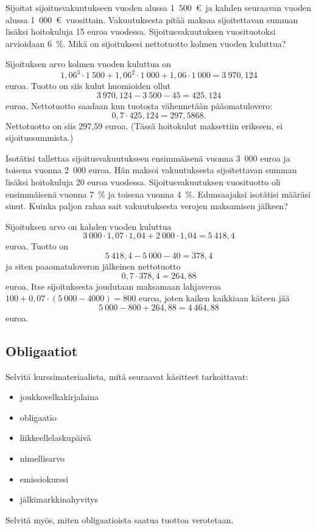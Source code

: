 \documentclass{article}\usepackage[]{graphicx}\usepackage[]{color}
\begin{document}
\begin{question} Sijoitat sijoitusvakuutukseen vuoden alussa 1~500~\euro\ ja kahden seuraavan vuoden alussa 1~000~\euro\ vuosittain. Vakuutuksesta pitää maksaa sijoitettavan summan lisäksi hoitokuluja 15 euroa vuodessa. Sijoitusvakuutuksen vuosituotoksi arvioidaan 6~\%. Mikä on sijoituksesi nettotuotto kolmen vuoden kuluttua? 
\end{question}
\begin{solution}


Sijoituksen arvo kolmen vuoden kuluttua on 
\[
  1{,}06^3\cdot1~500 + 1{,}06^2\cdot1~000 + 1{,}06\cdot1~000 = 3~970{,}124
\]
euroa.
Tuotto on siis kulut huomioiden ollut 
\[
  3~970{,}124 - 3~500 - 45 = 425{,}124
  \]
  euroa. Nettotuotto saadaan kun tuotosta vähennetään pääomatulovero:
\[
  0,7\cdot425{,}124 = 297{,}5868.
\]
Nettotuotto on siis 297{,}59 euroa. (Tässä hoitokulut maksettiin erikseen, ei sijoitussummista.)
\end{solution}

\begin{question} Isotätisi tallettaa sijoitusvakuutukseen ensimmäisenä vuonna 3~000 euroa ja toisena vuonna 2~000 euroa. Hän maksoi vakuutuksesta sijoitettavan summan lisäksi hoitokuluja 20 euroa vuodessa. Sijoitusvakuutuksen vuosituotto oli ensimmäisenä vuonna 7~\% ja toisena vuonna 4~\%. Edunsaajaksi isotätisi määräsi sinut. Kuinka paljon rahaa sait vakuutuksesta verojen maksamisen jälkeen?
\end{question}
\begin{solution}

Sijoituksen arvo on kahden vuoden kuluttua
\[
  3~000\cdot1{,}07\cdot1{,}04 + 2~000\cdot1{,}04 = 5~418{,}4
\]
euroa. Tuotto on 
\[
  5~418{,}4 - 5~000 - 40 = 378{,}4
\]
ja siten paaomatuloveron jälkeinen nettotuotto
\[
  0,7\cdot 378{,}4 = 264{,}88
\]
euroa. Itse sijoituksesta joudutaan maksamaan lahjaveroa \(100 + 0,07\cdot(5~000 - 4000) = 800\) euroa, joten kaiken kaikkiaan käteen jää
\[
5~000 - 800 + 264{,}88 = 4~464{,}88
\]
euroa. 
\end{solution}

\subsection*{Obligaatiot}

\begin{question}
  Selvitä kurssimateriaalista, mitä seuraavat käsitteet tarkoittavat:
  \begin{itemize}
    \item joukkovelkakirjalaina
    \item obligaatio
    \item liikkeellelaskupäivä
    \item nimellisarvo
    \item emissiokurssi
    \item jälkimarkkinahyvitys
  \end{itemize}
  Selvitä myös, miten obligaatioista saatua tuottoa verotetaan.
\end{question}
\end{document}
